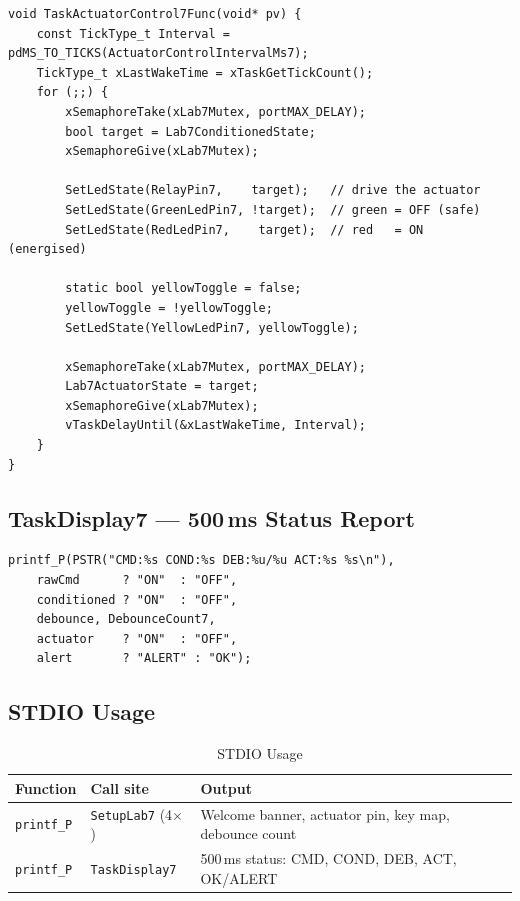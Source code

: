 \documentclass[12pt]{article}
\begin{document}
\begin{lstlisting}[caption={TaskActuatorControl7 --- 100\,ms relay + LED update}]
void TaskActuatorControl7Func(void* pv) {
    const TickType_t Interval = pdMS_TO_TICKS(ActuatorControlIntervalMs7);
    TickType_t xLastWakeTime = xTaskGetTickCount();
    for (;;) {
        xSemaphoreTake(xLab7Mutex, portMAX_DELAY);
        bool target = Lab7ConditionedState;
        xSemaphoreGive(xLab7Mutex);

        SetLedState(RelayPin7,    target);   // drive the actuator
        SetLedState(GreenLedPin7, !target);  // green = OFF (safe)
        SetLedState(RedLedPin7,    target);  // red   = ON  (energised)

        static bool yellowToggle = false;
        yellowToggle = !yellowToggle;
        SetLedState(YellowLedPin7, yellowToggle);

        xSemaphoreTake(xLab7Mutex, portMAX_DELAY);
        Lab7ActuatorState = target;
        xSemaphoreGive(xLab7Mutex);
        vTaskDelayUntil(&xLastWakeTime, Interval);
    }
}
\end{lstlisting}

\subsection{TaskDisplay7 --- 500\,ms Status Report}

\begin{lstlisting}[caption={TaskDisplay7 --- one-line status report}]
printf_P(PSTR("CMD:%s COND:%s DEB:%u/%u ACT:%s %s\n"),
    rawCmd      ? "ON"  : "OFF",
    conditioned ? "ON"  : "OFF",
    debounce, DebounceCount7,
    actuator    ? "ON"  : "OFF",
    alert       ? "ALERT" : "OK");
\end{lstlisting}

\subsection{STDIO Usage}

\begin{table}[H]
\centering
\begin{tabular}{@{}lp{4cm}p{6.0cm}@{}}
\toprule
\textbf{Function} & \textbf{Call site} & \textbf{Output} \\
\midrule
\texttt{printf\_P} & \texttt{SetupLab7} (4$\times$) & Welcome banner, actuator pin, key map, debounce count \\
\texttt{printf\_P} & \texttt{TaskDisplay7} & 500\,ms status: CMD, COND, DEB, ACT, OK/ALERT \\
\bottomrule
\end{tabular}
\caption{STDIO Usage}
\label{tab:stdio}
\end{table}
\end{document}
